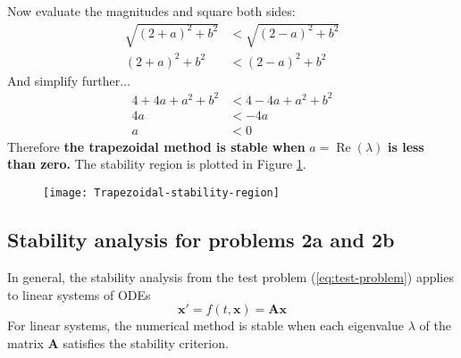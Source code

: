 \documentclass{article}
\begin{document}
Now evaluate the magnitudes and square both sides:
\begin{equation}
\begin{split}
\sqrt{(2 + a)^2 + b^2} & < \sqrt{(2 - a)^2 + b ^2} \\
(2 + a)^2 + b^2 & < (2 - a)^2 + b ^2
\end{split}
\end{equation}
And simplify further...
\begin{equation}
\begin{split}
4 + 4a + a^2 + b^2 & < 4 - 4a + a^2 + b^2 \\
4a & < -4a \\
a & < 0
\end{split}
\end{equation}
Therefore \textbf{the trapezoidal method is stable when} $a =\operatorname{Re}(\lambda)$ \textbf{is less than zero.}  The stability region is plotted in Figure \ref{fig:stability-plot}.
\begin{figure}[H]
	\centering
	\texttt{[image: Trapezoidal-stability-region]}
	\caption{}
	\label{fig:stability-plot}
\end{figure}
\subsection{Stability analysis for problems 2a and 2b}
In general, the stability analysis from the test problem (\ref{eq:test-problem}) applies to linear systems of ODEs
\begin{equation}
\bm{x'} = f(t, \bm{x}) = \bm{A}\bm{x}
\end{equation}
For linear systems, the numerical method is stable when each eigenvalue $\lambda$ of the matrix $\bm{A}$ satisfies the stability criterion.
\end{document}
